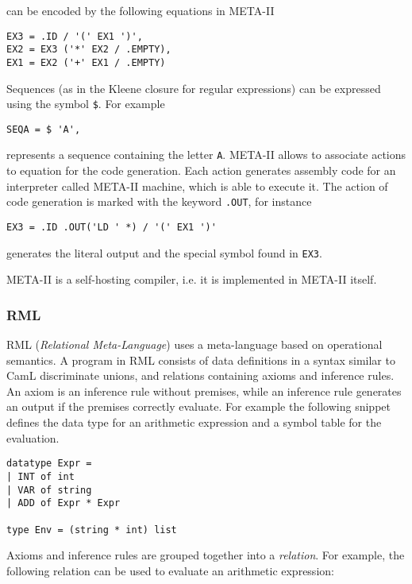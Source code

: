 \noindent
can be encoded by the following equations in META-II

\begin{lstlisting}
EX3 = .ID / '(' EX1 ')',
EX2 = EX3 ('*' EX2 / .EMPTY),
EX1 = EX2 ('+' EX1 / .EMPTY)
\end{lstlisting}

\noindent
Sequences (as in the Kleene closure for regular expressions) can be expressed using the symbol \texttt{\$}. For example

\begin{lstlisting}
SEQA = $ 'A',
\end{lstlisting}

\noindent
represents a sequence containing the letter \texttt{A}.
META-II allows to associate actions to equation for the code generation. Each action generates assembly code for an interpreter called META-II machine, which is able to execute it. The action of code generation is marked with the keyword \texttt{.OUT}, for instance

\begin{lstlisting}
EX3 = .ID .OUT('LD ' *) / '(' EX1 ')'
\end{lstlisting}

\noindent
generates the literal output and the special symbol found in \texttt{EX3}.

META-II is a self-hosting compiler, i.e. it is implemented in META-II itself.

\subsubsection{RML}
RML \cite{pettersson1996compiler} (\textit{Relational Meta-Language}) uses a meta-language based on operational semantics. A program in RML consists of data definitions in a syntax similar to CamL discriminate unions, and relations containing axioms and inference rules. An axiom is an inference rule without premises, while an inference rule generates an output if the premises correctly evaluate. For example the following snippet defines the data type for an arithmetic expression and a symbol table for the evaluation.

\begin{lstlisting}
datatype Expr =
| INT of int
| VAR of string
| ADD of Expr * Expr

type Env = (string * int) list
\end{lstlisting}

Axioms and inference rules are grouped together into a \textit{relation}. For example, the following relation can be used to evaluate an arithmetic expression:

